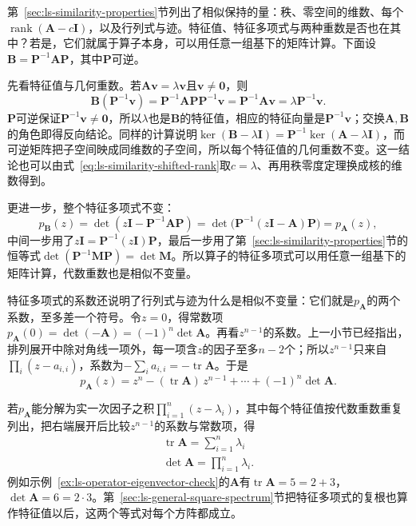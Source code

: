 第~\ref{sec:ls-similarity-properties}节列出了相似保持的量：秩、零空间的维数、每个$\operatorname{rank}(\bm A-c\bm I)$，以及行列式与迹。特征值、特征多项式与两种重数是否也在其中？若是，它们就属于算子本身，可以用任意一组基下的矩阵计算。下面设$\bm B=\bm P^{-1}\bm A\bm P$，其中$\bm P$可逆。

先看特征值与几何重数。若$\bm A\bm v=\lambda\bm v$且$\bm v\neq\bm0$，则
\[
 \bm B(\bm P^{-1}\bm v)=\bm P^{-1}\bm A\bm P\bm P^{-1}\bm v=\bm P^{-1}\bm A\bm v=\lambda\bm P^{-1}\bm v .
\]
$\bm P$可逆保证$\bm P^{-1}\bm v\neq\bm0$，所以$\lambda$也是$\bm B$的特征值，相应的特征向量是$\bm P^{-1}\bm v$；交换$\bm A,\bm B$的角色即得反向结论。同样的计算说明$\ker(\bm B-\lambda\bm I)=\bm P^{-1}\ker(\bm A-\lambda\bm I)$，而可逆矩阵把子空间映成同维数的子空间，所以每个特征值的几何重数不变。这一结论也可以由式~\eqref{eq:ls-similarity-shifted-rank}取$c=\lambda$、再用秩零度定理换成核的维数得到。

更进一步，整个特征多项式不变：
\[
 p_{\bm B}(z)=\det(z\bm I-\bm P^{-1}\bm A\bm P)=\det\bigl(\bm P^{-1}(z\bm I-\bm A)\bm P\bigr)=p_{\bm A}(z),
\]
中间一步用了$z\bm I=\bm P^{-1}(z\bm I)\bm P$，最后一步用了第~\ref{sec:ls-similarity-properties}节的恒等式$\det(\bm P^{-1}\bm M\bm P)=\det\bm M$。所以算子的特征多项式可以用任意一组基下的矩阵计算，代数重数也是相似不变量。

特征多项式的系数还说明了行列式与迹为什么是相似不变量：它们就是$p_{\bm A}$的两个系数，至多差一个符号。令$z=0$，得常数项$p_{\bm A}(0)=\det(-\bm A)=(-1)^n\det\bm A$。再看$z^{n-1}$的系数。上一小节已经指出，排列展开中除对角线一项外，每一项含$z$的因子至多$n-2$个；所以$z^{n-1}$只来自$\prod_i(z-a_{i,i})$，系数为$-\sum_ia_{i,i}=-\operatorname{tr}\bm A$。于是
\[
 p_{\bm A}(z)=z^n-(\operatorname{tr}\bm A)\,z^{n-1}+\cdots+(-1)^n\det\bm A .
\]

若$p_{\bm A}$能分解为实一次因子之积$\prod_{i=1}^n(z-\lambda_i)$，其中每个特征值按代数重数重复列出，把右端展开后比较$z^{n-1}$的系数与常数项，得
\[
 \begin{gathered}
\operatorname{tr}\bm A=\sum_{i=1}^n\lambda_i\\
\det\bm A=\prod_{i=1}^n\lambda_i .
 \end{gathered}
\]
例如示例~\ref{ex:ls-operator-eigenvector-check}的$\bm A$有$\operatorname{tr}\bm A=5=2+3$，$\det\bm A=6=2\cdot3$。第~\ref{sec:ls-general-square-spectrum}节把特征多项式的复根也算作特征值以后，这两个等式对每个方阵都成立。

